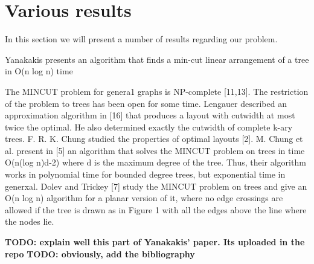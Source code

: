 \section{Various results}


In this section we will present a number of results regarding our problem. 

Yanakakis presents an algorithm that finds a min-cut linear arrangement of a tree in O(n log n) time \cite{yan}

The MINCUT problem for genera1 graphs is NP-complete
[11,13]. The restriction of the problem to trees has been open for some time.
Lengauer described an approximation algorithm in [16] that produces a layout
with cutwidth at most twice the optimal. He also determined exactly the cutwidth
of complete k-ary trees. F. R. K. Chung studied the properties of optimal layouts
[2]. M. Chung et al. present in [5] an algorithm that solves the MINCUT problem
on trees in time O(n(log n)d-2) where d is the maximum degree of the tree. Thus,
their algorithm works in polynomial time for bounded degree trees, but exponential
time in generxal. Dolev and Trickey [7] study the MINCUT problem on trees and
give an O(n log n) algorithm for a planar version of it, where no edge crossings are
allowed if the tree is drawn as in Figure 1 with all the edges above the line where
the nodes lie.


\textbf{TODO: explain well this part of Yanakakis' paper. Its uploaded in the repo}
\textbf{TODO: obviously, add the bibliography}
